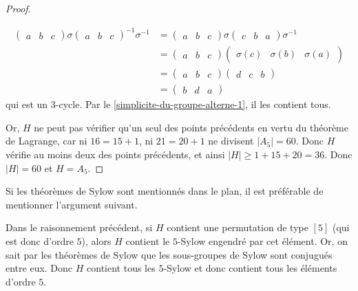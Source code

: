 \begin{proof}
\begin{itemize}
			\begin{align*}
				\begin{pmatrix} a & b & c \end{pmatrix} \sigma \begin{pmatrix} a & b & c \end{pmatrix}^{-1} \sigma^{-1} &= \begin{pmatrix} a & b & c \end{pmatrix} \sigma \begin{pmatrix} c & b & a \end{pmatrix} \sigma^{-1} \\
				&= \begin{pmatrix} a & b & c \end{pmatrix} \begin{pmatrix} \sigma(c) & \sigma(b) & \sigma(a) \end{pmatrix} \\
				&= \begin{pmatrix} a & b & c \end{pmatrix} \begin{pmatrix} d & c & b \end{pmatrix} \\
				&= \begin{pmatrix} b & d & a \end{pmatrix}
			\end{align*}
			qui est un $3$-cycle. Par le \cref{simplicite-du-groupe-alterne-1}, il les contient tous.
		\end{itemize}
		Or, $H$ ne peut pas vérifier qu'un seul des points précédents en vertu du théorème de Lagrange, car ni $16 = 15 + 1$, ni $21 = 20 + 1$ ne divisent $|A_5| = 60$. Donc $H$ vérifie au moins deux des points précédents, et ainsi $|H| \geq 1 + 15 + 20 = 36$. Donc $|H|=60$ et $H = A_5$.
	\end{proof}


	Si les théorèmes de Sylow sont mentionnés dans le plan, il est préférable de mentionner l'argument suivant.

	\begin{remark}
		Dans le raisonnement précédent, si $H$ contient une permutation de type $[5]$ (qui est donc d'ordre $5$), alors $H$ contient le $5$-Sylow engendré par cet élément. Or, on sait par les théorèmes de Sylow que les sous-groupes de Sylow sont conjugués entre eux. Donc $H$ contient tous les $5$-Sylow et donc contient tous les éléments d'ordre $5$.
	\end{remark}

